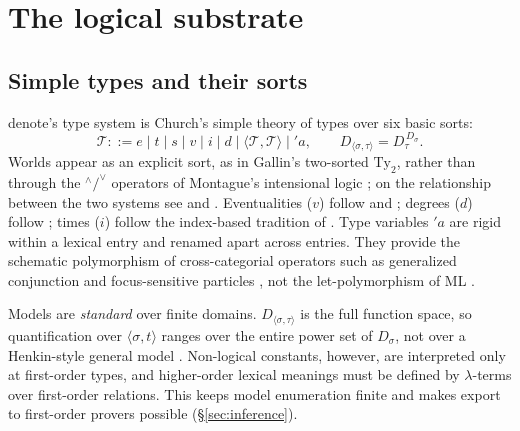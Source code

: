 \documentclass[11pt,a4paper]{article}
\newcommand{\dn}{\textsf{denote}}
\newcommand{\ty}[1]{\langle #1\rangle}
\theoremstyle{definition}
\begin{document}
\section{The logical substrate}\label{sec:substrate}

\subsection{Simple types and their sorts}
\dn{}'s type system is Church's simple theory of types \citep{church1940} over six basic sorts:
\begin{equation}
\mathcal{T}::= e\mid t\mid s\mid v\mid i\mid d\mid\ty{\mathcal{T},\mathcal{T}}\mid {}'a,\qquad D_{\ty{\sigma,\tau}}=D_\tau^{\,D_\sigma}.
\end{equation}
Worlds appear as an explicit sort, as in Gallin's two-sorted $\mathrm{Ty}_2$, rather than through the $^\wedge/^\vee$ operators of Montague's intensional logic \citep{gallin1975}; on the relationship between the two systems see \citet{gallin1975} and \citet{zimmermann1989}. Eventualities ($v$) follow \citet{davidson1967} and \citet{parsons1990}; degrees ($d$) follow \citet{cresswell1976}; times ($i$) follow the index-based tradition of \citet{montague1973}. Type variables $'a$ are rigid within a lexical entry and renamed apart across entries. They provide the schematic polymorphism of cross-categorial operators such as generalized conjunction \citep{parteerooth1983} and focus-sensitive particles \citep{rooth1985}, not the let-polymorphism of ML \citep{milner1978}.

Models are \emph{standard} over finite domains. $D_{\ty{\sigma,\tau}}$ is the full function space, so quantification over $\ty{\sigma,t}$ ranges over the entire power set of $D_\sigma$, not over a Henkin-style general model \citep{henkin1950}. Non-logical constants, however, are interpreted only at first-order types, and higher-order lexical meanings must be defined by $\lambda$-terms over first-order relations. This keeps model enumeration finite and makes export to first-order provers possible (\S\ref{sec:inference}).
\end{document}
